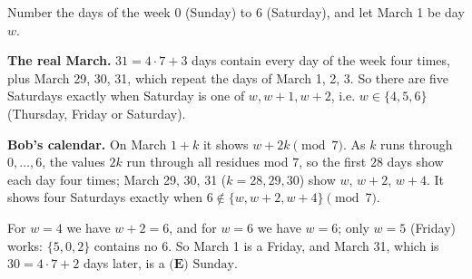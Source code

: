 Number the days of the week $0$ (Sunday) to $6$ (Saturday), and let March 1 be day $w$.

\textbf{The real March.} $31=4\cdot7+3$ days contain every day of the week four times, plus March 29, 30, 31, which repeat the days of March 1, 2, 3. So there are five Saturdays exactly when Saturday is one of $w,w+1,w+2$, i.e. $w\in\{4,5,6\}$ (Thursday, Friday or Saturday).

\textbf{Bob's calendar.} On March $1+k$ it shows $w+2k\pmod7$. As $k$ runs through $0,\dots,6$, the values $2k$ run through all residues mod $7$, so the first $28$ days show each day four times; March 29, 30, 31 ($k=28,29,30$) show $w$, $w+2$, $w+4$. It shows four Saturdays exactly when $6\notin\{w,w+2,w+4\}\pmod7$.

For $w=4$ we have $w+2=6$, and for $w=6$ we have $w=6$; only $w=5$ (Friday) works: $\{5,0,2\}$ contains no $6$. So March 1 is a Friday, and March 31, which is $30=4\cdot7+2$ days later, is a $\boxed{\textbf{(E) }\text{Sunday}}$.
